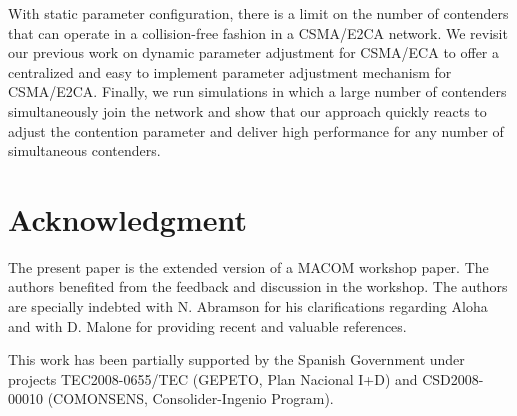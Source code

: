 \documentclass[journal]{IEEEtran}
\begin{document}
With static parameter configuration, there is a limit on the number of contenders that can operate in a collision-free fashion in a CSMA/E2CA network. We revisit our previous work on dynamic parameter adjustment for CSMA/ECA to offer a centralized and easy to implement parameter adjustment mechanism for CSMA/E2CA. Finally, we run simulations in which a large number of contenders simultaneously join the network and show that our approach quickly reacts to adjust the contention parameter and deliver high performance for any number of simultaneous contenders.










































\section*{Acknowledgment}
The present paper is the extended version of a MACOM workshop paper. The authors benefited from the feedback and discussion in the workshop. The authors are specially indebted with N. Abramson for his clarifications regarding Aloha and with D. Malone for providing recent and valuable references.

This work has been partially supported by the Spanish Government
under projects TEC2008-0655/TEC (GEPETO, Plan Nacional I+D) and CSD2008-00010 (COMONSENS, Consolider-Ingenio Program).




\ifCLASSOPTIONcaptionsoff
  \newpage
\fi









\end{document}
